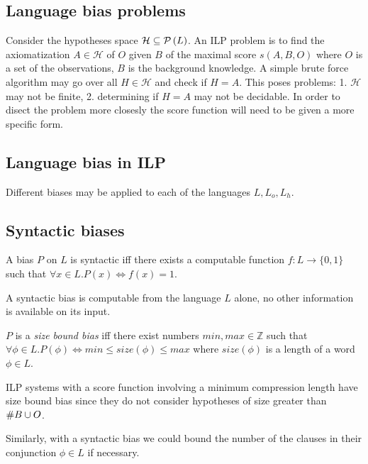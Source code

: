 \subsection{Language bias problems}
Consider the hypotheses space $\mathcal{H} \subseteq \mathcal{P} \left({ L }\right)$. An ILP problem is to find the axiomatization $A \in \mathcal{H}$ of $O$ given $B$ of the maximal score $s(A,B,O)$ where $O$ is a set of the observations, $B$ is the background knowledge.
A simple brute force algorithm may go over all $H \in \mathcal{H}$ and check if $H=A$. This poses problems:
1. $\mathcal{H}$ may not be finite,
2. determining if $H=A$ may not be decidable.
In order to disect the problem more closesly the score function will need to be given a more specific form.

\subsection{Language bias in ILP}
Different biases may be applied to each of the languages $L, L_o, L_h$. 

\subsection{Syntactic biases}

\begin{defn}
A bias $P$ on $L$ is syntactic iff there exists a computable function $f:L \to \{0,1\}$ such that $\forall x \in L.P(x) \iff f(x)=1$.
\end{defn}

\begin{remark}
A syntactic bias is computable from the language $L$ alone, no other information is available on its input.
\end{remark}

\begin{defn}
$P$ is a \emph{size bound bias} iff there exist numbers $min, max \in \mathbb{Z}$ such that $\forall \phi \in L. P(\phi) \iff min \le size(\phi) \le max$ where $size(\phi)$ is a length of a word $\phi \in L$.
\end{defn}

\begin{remark}
ILP systems with a score function involving a minimum compression length have size bound bias since they do not consider hypotheses of size greater than $\#B \cup O$.
\end{remark}

\begin{remark}
Similarly, with a syntactic bias we could bound the number of the clauses in their conjunction $\phi \in L$ if necessary.
\end{remark}

